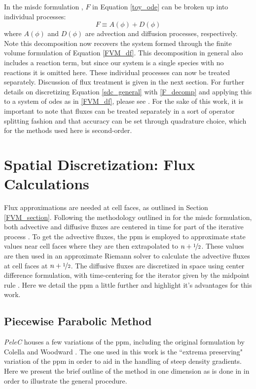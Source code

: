 In the \gls{misdc} formulation \cite{MISDC_general}, $F$ in Equation \ref{toy_ode} can be broken up into individual processes: 
\begin{equation} \label{F_decomp}
F \equiv A(\phi) + D(\phi)
\end{equation}
where $A(\phi)$ and $D(\phi)$ are advection and diffusion processes, respectively. Note this decomposition now recovers the system formed through the finite volume formulation of Equation \ref{FVM_df}. This decomposition in general also includes a reaction term, but since our system is a single species with no reactions it is omitted here. These individual processes can now be treated separately. Discussion of flux treatment is given in the next section. For further details on discretizing Equation \ref{sdc_general} with \ref{F_decomp} and applying this to a system of \gls{ode}s as in \ref{FVM_df}, please see \cite{SDC_PeleC}. For the sake of this work, it is important to note that fluxes can be treated separately in a sort of operator splitting fashion and that accuracy can be set through quadrature choice, which for the methods used here is second-order. 


\section{Spatial Discretization: Flux Calculations}
Flux approximations are needed at cell faces, as outlined in Section \ref{FVM_section}. Following the methodology outlined in for the \gls{misdc} formulation, both advective and diffusive fluxes are centered in time for part of the iterative process \cite{MISDC_general}. To get the advective fluxes, the \gls{ppm} \cite{1984JCoPPPM} is employed to approximate state values near cell faces where they are then extrapolated to $n+\nicefrac{1}{2}$. These values are then used in an approximate Riemann solver \cite{COLELLA1985264} to calculate the advective fluxes at cell faces at $n+\nicefrac{1}{2}$. The diffusive fluxes are discretized in space using center difference formulation, with time-centering for the iterator given by the midpoint rule \cite{COLELLA20087069, MILLER200226}. Here we detail the \gls{ppm} a little further and highlight it's advantages for this work.
\subsection{Piecewise Parabolic Method}
\textit{PeleC} houses a few variations of the \gls{ppm}, including the original formulation by Colella and Woodward \cite{1984JCoPPPM}. The one used in this work is the ``extrema preserving" variation of the \gls{ppm} \cite{COLELLA20087069, MILLER200226} in order to aid in the handling of steep density gradients. Here we present the brief outline of the method in one dimension as is done in \cite{PPM_WENO} in order to illustrate the general procedure. 

